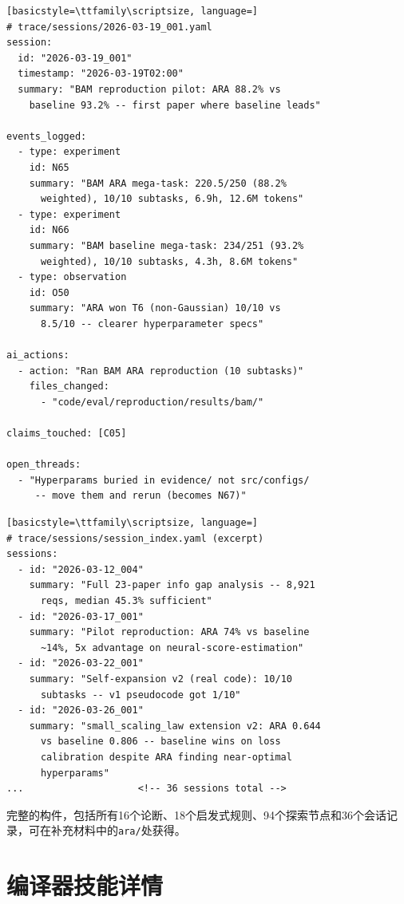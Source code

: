\begin{lstlisting}[basicstyle=\ttfamily\scriptsize, language=]
# trace/sessions/2026-03-19_001.yaml
session:
  id: "2026-03-19_001"
  timestamp: "2026-03-19T02:00"
  summary: "BAM reproduction pilot: ARA 88.2% vs
    baseline 93.2% -- first paper where baseline leads"

events_logged:
  - type: experiment
    id: N65
    summary: "BAM ARA mega-task: 220.5/250 (88.2%
      weighted), 10/10 subtasks, 6.9h, 12.6M tokens"
  - type: experiment
    id: N66
    summary: "BAM baseline mega-task: 234/251 (93.2%
      weighted), 10/10 subtasks, 4.3h, 8.6M tokens"
  - type: observation
    id: O50
    summary: "ARA won T6 (non-Gaussian) 10/10 vs
      8.5/10 -- clearer hyperparameter specs"

ai_actions:
  - action: "Ran BAM ARA reproduction (10 subtasks)"
    files_changed:
      - "code/eval/reproduction/results/bam/"

claims_touched: [C05]

open_threads:
  - "Hyperparams buried in evidence/ not src/configs/
     -- move them and rerun (becomes N67)"
\end{lstlisting}

\begin{lstlisting}[basicstyle=\ttfamily\scriptsize, language=]
# trace/sessions/session_index.yaml (excerpt)
sessions:
  - id: "2026-03-12_004"
    summary: "Full 23-paper info gap analysis -- 8,921
      reqs, median 45.3% sufficient"
  - id: "2026-03-17_001"
    summary: "Pilot reproduction: ARA 74% vs baseline
      ~14%, 5x advantage on neural-score-estimation"
  - id: "2026-03-22_001"
    summary: "Self-expansion v2 (real code): 10/10
      subtasks -- v1 pseudocode got 1/10"
  - id: "2026-03-26_001"
    summary: "small_scaling_law extension v2: ARA 0.644
      vs baseline 0.806 -- baseline wins on loss
      calibration despite ARA finding near-optimal
      hyperparams"
...                    <!-- 36 sessions total -->
\end{lstlisting}

\noindent 完整的构件，包括所有16个论断、18个启发式规则、94个探索节点和36个会话记录，可在补充材料中的\texttt{ara/}处获得。


\section{编译器技能详情}
\label{sec-system-details}

